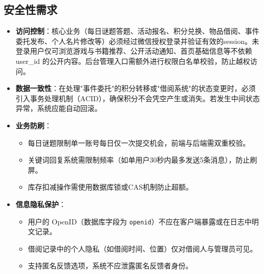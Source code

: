 \documentclass[a4paper,12pt]{article}
\begin{document}
\subsection{安全性需求}
\begin{itemize}
    \item \textbf{访问控制}：核心业务（每日谜题答题、活动报名、积分兑换、物品借阅、事件委托发布、个人名片修改等）必须经过微信授权登录并验证有效的session。未登录用户仅可浏览游戏与书籍推荐、公开活动通知、首页基础信息等不依赖 user\_id 的公开内容。后台管理入口需额外进行权限白名单校验，防止越权访问。
    \item \textbf{数据一致性}：在处理"事件委托"的积分转移或"借阅系统"的状态变更时，必须引入事务处理机制（ACID），确保积分不会凭空产生或消失。若发生中间状态异常，系统应能自动回滚。
    \item \textbf{业务防刷}：
        \begin{itemize}
            \item 每日谜题限制单一账号每日仅一次提交机会，前端与后端需双重校验。
            \item 关键词回复系统需限制频率（如单用户30秒内最多发送5条消息），防止刷屏。
            \item 库存扣减操作需使用数据库锁或CAS机制防止超额。
        \end{itemize}
    \item \textbf{信息隐私保护}：
        \begin{itemize}
            \item 用户的 OpenID（数据库字段为 \texttt{openid}）不应在客户端暴露或在日志中明文记录。
            \item 借阅记录中的个人隐私（如借阅时间、位置）仅对借阅人与管理员可见。
            \item 支持匿名反馈选项，系统不应泄露匿名反馈者身份。
        \end{itemize}
\end{itemize}
\end{document}

